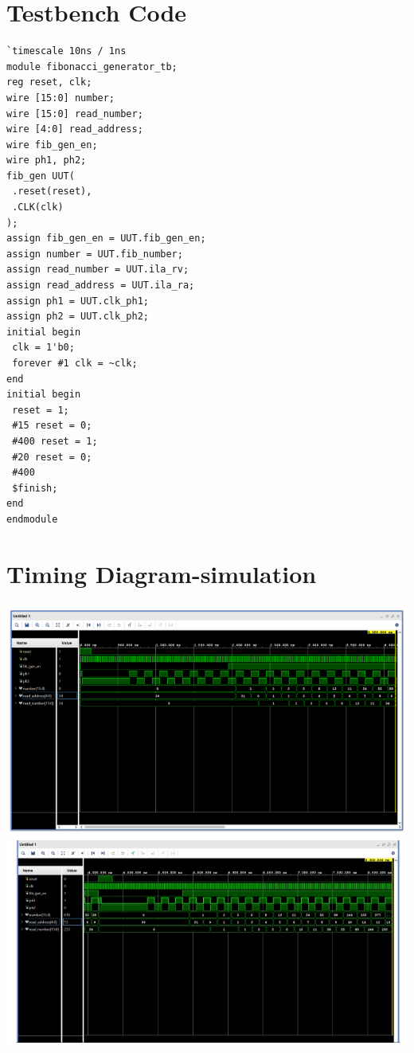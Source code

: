 \documentclass{article}
\begin{document}
\section{Testbench Code}
\begin{lstlisting}
`timescale 10ns / 1ns
module fibonacci_generator_tb;
reg reset, clk;
wire [15:0] number;
wire [15:0] read_number;
wire [4:0] read_address;
wire fib_gen_en;
wire ph1, ph2;
fib_gen UUT(
 .reset(reset),
 .CLK(clk)
);
assign fib_gen_en = UUT.fib_gen_en;
assign number = UUT.fib_number;
assign read_number = UUT.ila_rv;
assign read_address = UUT.ila_ra;
assign ph1 = UUT.clk_ph1;
assign ph2 = UUT.clk_ph2;
initial begin
 clk = 1'b0;
 forever #1 clk = ~clk;
end
initial begin
 reset = 1;
 #15 reset = 0;
 #400 reset = 1;
 #20 reset = 0;
 #400
 $finish;
end
endmodule
\end{lstlisting}
\section{Timing Diagram-simulation}
\includegraphics[width=1\columnwidth]{figs/4.jpeg}
\includegraphics[width=1\columnwidth]{figs/5.jpeg}
\end{document}
